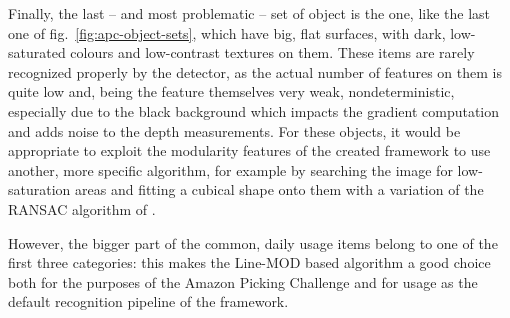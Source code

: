 Finally, the last -- and most problematic -- set of object is the one,
like the last one of fig.~\ref{fig:apc-object-sets}, which have big,
flat surfaces, with dark, low-saturated colours and low-contrast
textures on them. These items are rarely recognized properly by the
detector, as the actual number of features on them is quite low and,
being the feature themselves very weak, nondeterministic, especially
due to the black background which impacts the gradient computation and
adds noise to the depth measurements. For these objects, it would be
appropriate to exploit the modularity features of the created
framework to use another, more specific algorithm, for example by
searching the image for low-saturation areas and fitting a cubical
shape onto them with a variation of the RANSAC algorithm of \cite{ransac}.

However, the bigger part of the common, daily usage items belong to
one of the first three categories: this makes the Line-MOD based
algorithm a good choice both for the purposes of the Amazon Picking
Challenge and for usage as the default recognition pipeline of the
framework.




